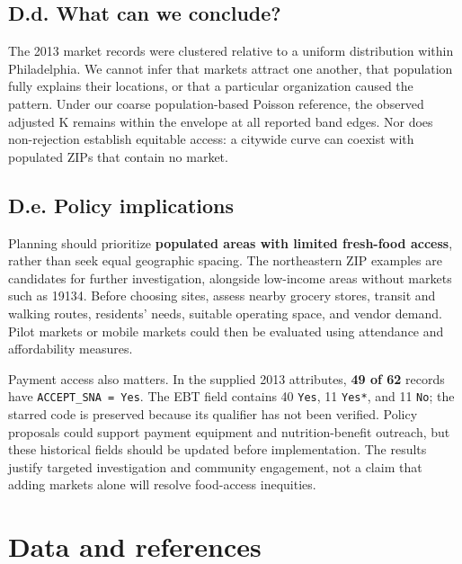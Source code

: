 \documentclass[
  10pt,
]{article}
\begin{document}
\subsection{D.d. What can we conclude?}\label{d.d.-what-can-we-conclude}

The 2013 market records were clustered relative to a uniform
distribution within Philadelphia. We cannot infer that markets attract
one another, that population fully explains their locations, or that a
particular organization caused the pattern. Under our coarse
population-based Poisson reference, the observed adjusted K remains
within the envelope at all reported band edges. Nor does non-rejection
establish equitable access: a citywide curve can coexist with populated
ZIPs that contain no market.

\newpage

\subsection{D.e. Policy implications}\label{d.e.-policy-implications}

Planning should prioritize \textbf{populated areas with limited
fresh-food access}, rather than seek equal geographic spacing. The
northeastern ZIP examples are candidates for further investigation,
alongside low-income areas without markets such as 19134. Before
choosing sites, assess nearby grocery stores, transit and walking
routes, residents' needs, suitable operating space, and vendor demand.
Pilot markets or mobile markets could then be evaluated using attendance
and affordability measures.

Payment access also matters. In the supplied 2013 attributes, \textbf{49
of 62} records have \texttt{ACCEPT\_SNA\ =\ Yes}. The EBT field contains
40 \texttt{Yes}, 11 \texttt{Yes*}, and 11 \texttt{No}; the starred code
is preserved because its qualifier has not been verified. Policy
proposals could support payment equipment and nutrition-benefit
outreach, but these historical fields should be updated before
implementation. The results justify targeted investigation and community
engagement, not a claim that adding markets alone will resolve
food-access inequities.

\section{Data and references}\label{data-and-references}
\end{document}
